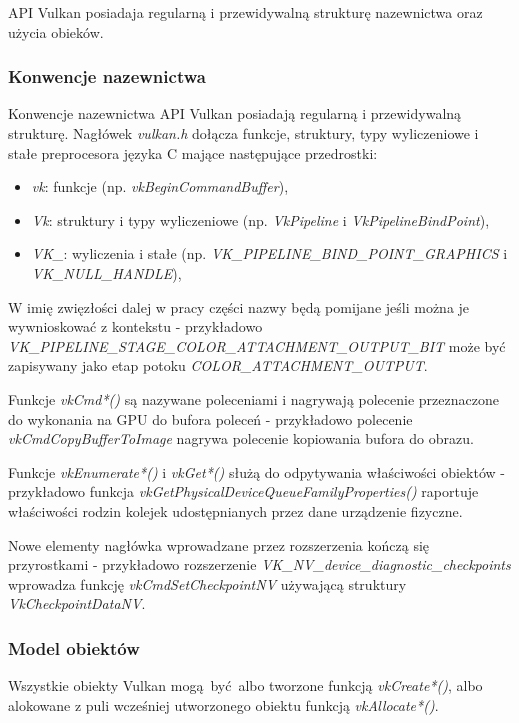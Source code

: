 API Vulkan posiadaja regularną i przewidywalną strukturę nazewnictwa oraz użycia obieków.

\subsubsection{Konwencje nazewnictwa}
Konwencje nazewnictwa API Vulkan posiadają regularną i przewidywalną strukturę.
Nagłówek \textit{vulkan.h} dołącza funkcje, struktury, typy wyliczeniowe i stałe preprocesora języka C mające następujące przedrostki:
\begin{itemize}
	\item \textit{vk}: funkcje (np. \textit{vkBeginCommandBuffer}),
	\item \textit{Vk}: struktury i typy wyliczeniowe (np. \textit{VkPipeline} i  \textit{VkPipelineBindPoint}),
	\item \textit{VK\_}: wyliczenia i stałe (np. \textit{VK\_PIPELINE\_BIND\_POINT\_GRAPHICS} i \textit{VK\_NULL\_HANDLE}),
\end{itemize}
W imię zwięzłości dalej w pracy części nazwy będą pomijane jeśli można je wywnioskować z kontekstu - przykładowo \textit{VK\_PIPELINE\_STAGE\_COLOR\_ATTACHMENT\_OUTPUT\_BIT} może być zapisywany jako etap potoku \textit{COLOR\_ATTACHMENT\_OUTPUT}.

Funkcje \textit{vkCmd*()} są nazywane poleceniami i nagrywają polecenie przeznaczone do wykonania na GPU do bufora poleceń - przykładowo polecenie \textit{vkCmdCopyBufferToImage} nagrywa polecenie kopiowania bufora do obrazu.

Funkcje \textit{vkEnumerate*()} i \textit{vkGet*()} służą do odpytywania właściwości obiektów - przykładowo funkcja \textit{vkGetPhysicalDeviceQueueFamilyProperties()} raportuje właściwości rodzin kolejek udostępnianych przez dane urządzenie fizyczne.

Nowe elementy nagłówka wprowadzane przez rozszerzenia kończą się przyrostkami - przykładowo rozszerzenie \textit{VK\_NV\_device\_diagnostic\_checkpoints} wprowadza funkcję \textit{vkCmdSetCheckpointNV} używającą struktury \textit{VkCheckpointDataNV}.

\subsubsection{Model obiektów}

Wszystkie obiekty Vulkan mogą być albo tworzone funkcją \textit{vkCreate*()}, albo alokowane z puli wcześniej utworzonego obiektu funkcją \textit{vkAllocate*()}.

